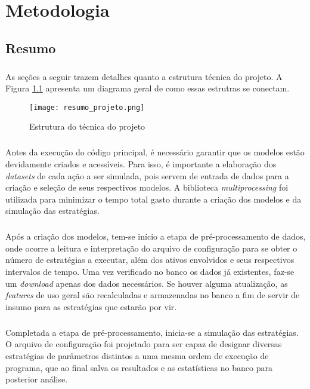 \chapter{Metodologia}
\label{cap3}



\FloatBarrier
\section{Resumo}

\paragraph{} As seções a seguir trazem detalhes quanto a estrutura técnica do projeto. A Figura \ref{fig:100} apresenta um diagrama geral de como essas estrutras se conectam.

\begin{figure}[!htb]
    \texttt{[image: resumo\_projeto.png]}
    \centering
    \caption{Estrutura do técnica do projeto}
    \label{fig:100}
\end{figure}

\paragraph{} Antes da execução do código principal, é necessário garantir que os modelos estão devidamente criados e acessíveis. Para isso, é importante a elaboração dos \textit{datasets} de cada ação a ser simulada, pois servem de entrada de dados para a criação e seleção de seus respectivos modelos. A biblioteca \textit{multiprocessing} foi utilizada para minimizar o tempo total gasto durante a criação dos modelos e da simulação das estratégias.

\paragraph{} Após a criação dos modelos, tem-se início a etapa de pré-processamento de dados, onde ocorre a leitura e interpretação do arquivo de configuração para se obter o número de estratégias a executar, além dos ativos envolvidos e seus respectivos intervalos de tempo. Uma vez verificado no banco os dados já existentes, faz-se um \textit{download} apenas dos dados necessários. Se houver alguma atualização, as \textit{features} de uso geral são recalculadas e armazenadas no banco a fim de servir de insumo para as estratégias que estarão por vir.

\paragraph{} Completada a etapa de pré-processamento, inicia-se a simulação das estratégias. O arquivo de configuração foi projetado para ser capaz de designar diversas estratégias de parâmetros distintos a uma mesma ordem de execução de programa, que ao final salva os resultados e as estatísticas no banco para posterior análise.

